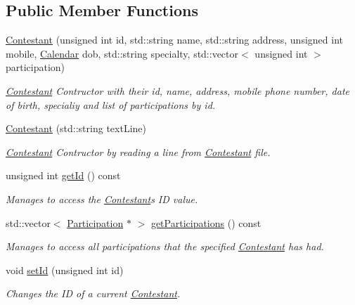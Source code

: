 \subsection*{Public Member Functions}
\begin{DoxyCompactItemize}
\item 
\hyperlink{class_contestant_a4f6ad68b8ea17d3cfc18581f62ea4806}{Contestant} (unsigned int id, std\+::string name, std\+::string address, unsigned int mobile, \hyperlink{class_calendar}{Calendar} dob, std\+::string specialty, std\+::vector$<$ unsigned int $>$ participation)
\begin{DoxyCompactList}\small\item\em \hyperlink{class_contestant}{Contestant} Contructor with their id, name, address, mobile phone number, date of birth, specialiy and list of participations by id. \end{DoxyCompactList}\item 
\mbox{\label{class_contestant_ad9d2408c8ffd36832801c25d836be630}} 
\hyperlink{class_contestant_ad9d2408c8ffd36832801c25d836be630}{Contestant} (std\+::string text\+Line)
\begin{DoxyCompactList}\small\item\em \hyperlink{class_contestant}{Contestant} Contructor by reading a line from \hyperlink{class_contestant}{Contestant} file. \end{DoxyCompactList}\item 
unsigned int \hyperlink{class_contestant_af3b5ca4f5150092fac946d6aa7301cd3}{get\+Id} () const
\begin{DoxyCompactList}\small\item\em Manages to access the \hyperlink{class_contestant}{Contestant}\textquotesingle{}s ID value. \end{DoxyCompactList}\item 
std\+::vector$<$ \hyperlink{struct_participation}{Participation} $\ast$ $>$ \hyperlink{class_contestant_abd0caa85a134d63212cf9e0f9ccc7a1d}{get\+Participations} () const
\begin{DoxyCompactList}\small\item\em Manages to access all participations that the specified \hyperlink{class_contestant}{Contestant} has had. \end{DoxyCompactList}\item 
void \hyperlink{class_contestant_add8973daf90279756d9ba846dcbffa67}{set\+Id} (unsigned int id)
\begin{DoxyCompactList}\small\item\em Changes the ID of a current \hyperlink{class_contestant}{Contestant}. \end{DoxyCompactList}\item 

\end{DoxyCompactItemize}
